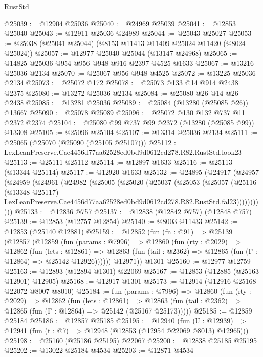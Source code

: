\begin{lexlean}{RustStd}
\begin{coremodule}
@25039 := @12904 @25036
@25040 := @24969 @25039
@25041 := @12853 @25040
@25043 := @12911 @25036 @24989
@25044 := @25043 @25027
@25053 := @25038 (@25041 @25044) (@8153 @11413 @11409 @25024 @11420 (@8024 @25024))
@25057 := @12977 @25040 @25044 (@13147 @24968)
@25065 := @14825 @25036 @954 @956 @948 @916 @2397 @4525 @1633
@25067 := @13216 @25036 @2134
@25070 := @25067 @956 @948 @4525
@25072 := @13225 @25036 @2134
@25073 := @25072 @172
@25078 := @25073 @133 @14 @914 @2438 @2375
@25080 := @13272 @25036 @2134
@25084 := @25080 @26 @14 @26 @2438
@25085 := @13281 @25036
@25089 := @25084 (@13280 (@25085 @26)) @13667
@25090 := @25078 @25089
@25096 := @25072 @130 @132 @737 @11 @2372 @2374
@25104 := @25080 @99 @737 @99 @2372 (@13280 (@25085 @99)) @13308
@25105 := @25096 @25104
@25107 := @13314 @25036 @2134
@25111 := @25065 (@25070 (@25090 (@25105 @25107)))
@25112 := LexLeanPreserve.Cae4456d77aa62528ed0bd9d0612cd278.R82.RustStd.look23
@25113 := @25111 @25112
@25114 := @12897 @1633
@25116 := @25113 (@13344 @25114)
@25117 := @12920 @1633
@25132 := @24895
    (@24917
      (@24957
        (@24959
          (@24961
            (@24982
              (@25005
                (@25020
                  (@25037
                    (@25053
                      (@25057
                        (@25116
                          (@13348 @25117)
                          LexLeanPreserve.Cae4456d77aa62528ed0bd9d0612cd278.R82.RustStd.fal23)))))))))))
@25133 := @12836 @757
@25137 := @12838 (@12842 @757) (@12848 @757)
@25139 := @12853 (@12757 @12854)
@25140 := @8003 @11433
@25142 := @12853 (@25140 @12881)
@25159 := @12852
    (fun (fn : @91) =>
    @25139
      (@12857
        (@12859
          (fun (params : @7996) =>
          @12860
            (fun (rty : @2029) =>
            @12862
              (fun (lets : @12861) =>
              @12863 (fun (tail : @2362) => @12865 (fun (Γ : @12864) => @25142 @12926))))))
        @12971))
    @1301
@25160 := @12977 @12759
@25163 := @12893 (@12894 @1301) @22069
@25167 := @12853 (@12885 (@25163 @12901) @12905)
@25168 := @12917 @1301
@25173 := @12914 (@12916 @25168 @22072 @8007 @8010)
@25184 := fun (params : @7996) =>
  @12860
    (fun (rty : @2029) =>
    @12862
      (fun (lets : @12861) =>
      @12863 (fun (tail : @2362) => @12865 (fun (Γ : @12864) => @25142 (@25167 @25173)))))
@25185 := @12859 @25184
@25186 := @12857 @25185
@25195 := @12940
    (fun (U : @12939) => @12941 (fun (t : @7) => @12948 (@12853 (@12954 @22069 @8013) @12965)))
@25198 := @25160 (@25186 @25195) @22067
@25200 := @12838 @25185 @25195
@25202 := @13022 @25184 @4534
@25203 := @12871 @4534

\end{coremodule}
\end{lexlean}
